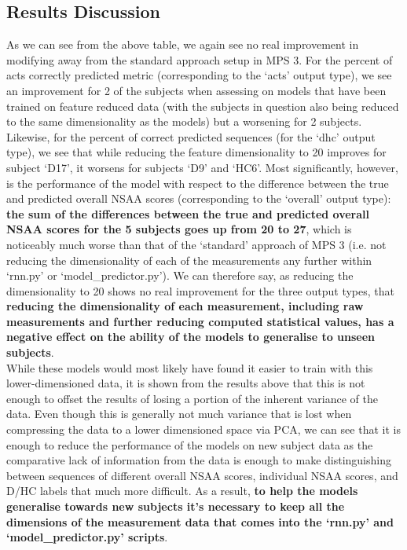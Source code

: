 \documentclass[12pt,twoside]{report}
\begin{document}
\subsection{Results Discussion}

\quad As we can see from the above table, we again see no real improvement in modifying away from the standard approach setup in MPS 3. For the percent of acts correctly predicted metric (corresponding to the ‘acts’ output type), we see an improvement for 2 of the subjects when assessing on models that have been trained on feature reduced data (with the subjects in question also being reduced to the same dimensionality as the models) but a worsening for 2 subjects. Likewise, for the percent of correct predicted sequences (for the ‘dhc’ output type), we see that while reducing the feature dimensionality to 20 improves for subject ‘D17’, it worsens for subjects ‘D9’ and ‘HC6’. Most significantly, however, is the performance of the model with respect to the difference between the true and predicted overall NSAA scores (corresponding to the ‘overall’ output type): \textbf{the sum of the differences between the true and predicted overall NSAA scores for the 5 subjects goes up from 20 to 27}, which is noticeably much worse than that of the ‘standard’ approach of MPS 3 (i.e. not reducing the dimensionality of each of the measurements any further within ‘rnn.py’ or ‘model\_predictor.py’). We can therefore say, as reducing the dimensionality to 20 shows no real improvement for the three output types, that \textbf{reducing the dimensionality of each measurement, including raw measurements and further reducing computed statistical values, has a negative effect on the ability of the models to generalise to unseen subjects}.\\

\quad While these models would most likely have found it easier to train with this lower-dimensioned data, it is shown from the results above that this is not enough to offset the results of losing a portion of the inherent variance of the data. Even though this is generally not much variance that is lost when compressing the data to a lower dimensioned space via PCA, we can see that it is enough to reduce the performance of the models on new subject data as the comparative lack of information from the data is enough to make distinguishing between sequences of different overall NSAA scores, individual NSAA scores, and D/HC labels that much more difficult. As a result, \textbf{to help the models generalise towards new subjects it’s necessary to keep all the dimensions of the measurement data that comes into the ‘rnn.py’ and ‘model\_predictor.py’ scripts}.
\end{document}
